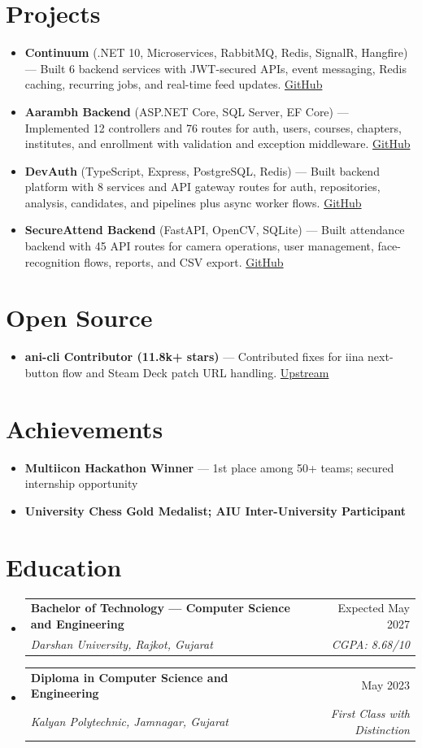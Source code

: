 \documentclass[11pt,a4paper]{article}
\makeatletter
\newcommand{\resumeSubheading}[4]{
  \vspace{-1pt}\item
    \begin{tabular*}{0.97\textwidth}[t]{l@{\extracolsep{\fill}}r}
      \textbf{#1} & #2 \\
      \textit{#3} & \textit{#4} \\
    \end{tabular*}\vspace{-3pt}
}
\newcommand{\resumeItem}[1]{
  \item\small{#1 \vspace{-1pt}}
}
\makeatother
\begin{document}
\section{Projects}
\begin{itemize}[leftmargin=*]
  \resumeItem{\textbf{Continuum} (.NET 10, Microservices, RabbitMQ, Redis, SignalR, Hangfire) --- Built 6 backend services with JWT-secured APIs, event messaging, Redis caching, recurring jobs, and real-time feed updates. \href{https://github.com/Dhairya3391/continuum}{GitHub}}
  \resumeItem{\textbf{Aarambh Backend} (ASP.NET Core, SQL Server, EF Core) --- Implemented 12 controllers and 76 routes for auth, users, courses, chapters, institutes, and enrollment with validation and exception middleware. \href{https://github.com/Dhairya3391/Aarambh}{GitHub}}
  \resumeItem{\textbf{DevAuth} (TypeScript, Express, PostgreSQL, Redis) --- Built backend platform with 8 services and API gateway routes for auth, repositories, analysis, candidates, and pipelines plus async worker flows. \href{https://github.com/Dhairya3391/devAuth}{GitHub}}
  \resumeItem{\textbf{SecureAttend Backend} (FastAPI, OpenCV, SQLite) --- Built attendance backend with 45 API routes for camera operations, user management, face-recognition flows, reports, and CSV export. \href{https://github.com/Dhairya3391/SecureAttend}{GitHub}}
\end{itemize}

\section{Open Source}
\begin{itemize}[leftmargin=*]
  \resumeItem{\textbf{ani-cli Contributor (11.8k+ stars)} --- Contributed fixes for iina next-button flow and Steam Deck patch URL handling. \href{https://github.com/pystardust/ani-cli}{Upstream}}
\end{itemize}

\section{Achievements}
\begin{itemize}[leftmargin=*]
  \resumeItem{\textbf{Multiicon Hackathon Winner} --- 1st place among 50+ teams; secured internship opportunity}
  \resumeItem{\textbf{University Chess Gold Medalist; AIU Inter-University Participant}}
\end{itemize}

\section{Education}
\begin{itemize}[leftmargin=*]
\resumeSubheading
{Bachelor of Technology --- Computer Science and Engineering}{Expected May 2027}
{Darshan University, Rajkot, Gujarat}{CGPA: 8.68/10}
\resumeSubheading
{Diploma in Computer Science and Engineering}{May 2023}
{Kalyan Polytechnic, Jamnagar, Gujarat}{First Class with Distinction}
\end{itemize}
\end{document}
